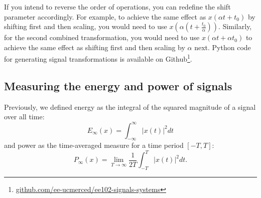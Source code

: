 \documentclass{ee102_notes}
\begin{document}
If you intend to reverse the order of operations, you can redefine the shift parameter accordingly. For example, to achieve the same effect as $x(\alpha t + t_0)$ by shifting first and then scaling, you would need to use $x(\alpha (t + \frac{t_0}{\alpha}))$. Similarly, for the second combined transformation, you would need to use $x(\alpha t + \alpha t_0)$ to achieve the same effect as shifting first and then scaling by $\alpha$ next. Python code for generating signal transformations is available on Github\footnote{\href{https://github.com/ee-ucmerced/ee102-signals-systems/tree/main/lecture\_notes/week2/transformations.ipynb}{github.com/ee-ucmerced/ee102-signals-systems}}.

\subsection{Measuring the energy and power of signals}
Previously, we defined energy as the integral of the squared magnitude of a signal over all time:
\[E_\infty(x) = \int_{-\infty}^{\infty} |x(t)|^2 dt
\]
and power as the time-averaged measure for a time period $[-T, T]$:
\[
P_\infty(x) = \lim_{T \to \infty} \frac{1}{2T} \int_{-T}^{T} |x(t)|^2 dt.
\]
\end{document}
